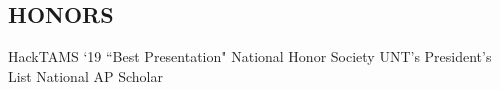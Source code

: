 \documentclass[margin]{res}
\begin{document}
\begin{resume}


\section{HONORS}
HackTAMS `19 ``Best Presentation" \textbullet{} National Honor Society \textbullet{} UNT's President's List \textbullet{} National AP Scholar




\end{resume}
\(\)
\end{document}
